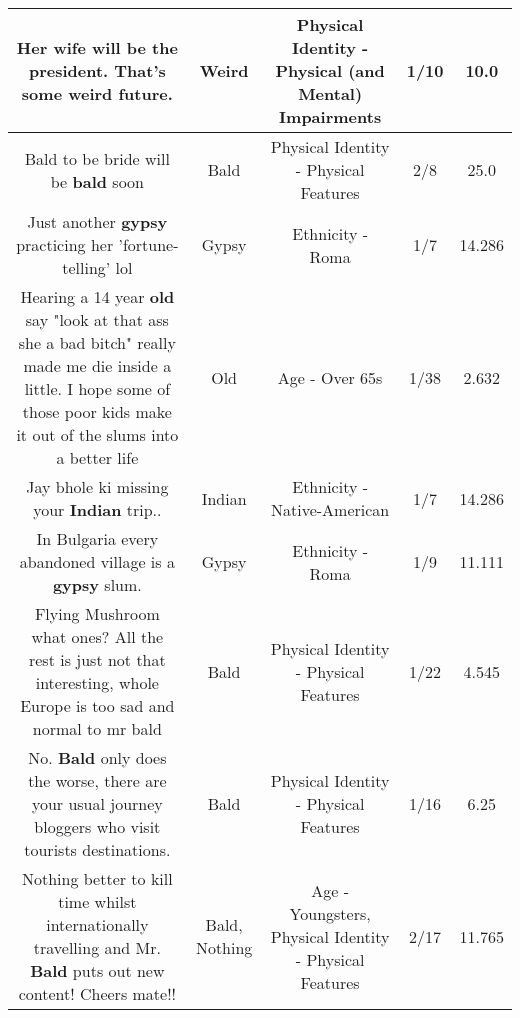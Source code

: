 \documentclass[11pt]{article}
\newlength\mylength
\begin{document}
\begin{center}
\begin{longtable}{|C{.65\mylength}|C{.30\mylength}|C{.12\mylength}|C{.12\mylength}|C{.12\mylength}|}
  \small Her wife will be the president. That's some \textbf{weird} future.\normalsize   & Weird & Physical Identity - Physical (and Mental) Impairments & 1/10 & 10.0 \\  \hline
  \small Bald to be bride will be \textbf{bald} soon\normalsize   & Bald & Physical Identity - Physical Features & 2/8 & 25.0 \\  \hline
  \small Just another \textbf{gypsy} practicing her 'fortune-telling' lol\normalsize   & Gypsy & Ethnicity - Roma & 1/7 & 14.286 \\  \hline
  \small Hearing a 14 year \textbf{old} say "look at that ass she a bad bitch" really made me die inside a little. I hope some of  those poor kids make it out of the slums into a better life\normalsize   & Old & Age - Over 65s & 1/38 & 2.632 \\  \hline
  \small Jay bhole ki missing your \textbf{Indian} trip..\normalsize   & Indian & Ethnicity - Native-American & 1/7 & 14.286 \\  \hline
  \small In Bulgaria every abandoned village is a \textbf{gypsy} slum.\normalsize   & Gypsy & Ethnicity - Roma & 1/9 & 11.111 \\  \hline
  \small Flying Mushroom what ones? All the rest is just not that interesting, whole Europe is too sad and normal to mr bald\normalsize   & Bald & Physical Identity - Physical Features & 1/22 & 4.545 \\  \hline
  \small No. \textbf{Bald} only does the worse, there are your usual journey bloggers who visit tourists destinations.\normalsize   & Bald & Physical Identity - Physical Features & 1/16 & 6.25 \\  \hline
  \small Nothing better to kill time whilst internationally travelling and Mr. \textbf{Bald} puts out new content! Cheers mate!!\normalsize   & Bald, Nothing & Age - Youngsters, Physical Identity - Physical Features & 2/17 & 11.765 \\  \hline

\end{longtable}
\end{center}
\end{document}
